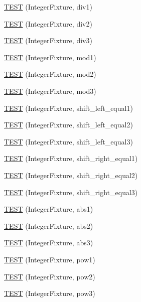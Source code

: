 \begin{DoxyCompactItemize}
\item 
\hyperlink{temp_test_integer_8c_09_09_adb0d928491fb9ea9cc626a106df71593}{T\-E\-S\-T} (Integer\-Fixture, div1)
\item 
\hyperlink{temp_test_integer_8c_09_09_ad51a92e11e604831df276045d3302c82}{T\-E\-S\-T} (Integer\-Fixture, div2)
\item 
\hyperlink{temp_test_integer_8c_09_09_a3d8823c1928745620c842c34fd753c9f}{T\-E\-S\-T} (Integer\-Fixture, div3)
\item 
\hyperlink{temp_test_integer_8c_09_09_a5a3e5e2da8ceac800cf98ccc31190fb3}{T\-E\-S\-T} (Integer\-Fixture, mod1)
\item 
\hyperlink{temp_test_integer_8c_09_09_af8da24ec2c1997a271cf2132d137fa5d}{T\-E\-S\-T} (Integer\-Fixture, mod2)
\item 
\hyperlink{temp_test_integer_8c_09_09_a2b100215b05edf640337b4808eef0447}{T\-E\-S\-T} (Integer\-Fixture, mod3)
\item 
\hyperlink{temp_test_integer_8c_09_09_ac61631f702c7ea22e5bd4fa98969e9ea}{T\-E\-S\-T} (Integer\-Fixture, shift\-\_\-left\-\_\-equal1)
\item 
\hyperlink{temp_test_integer_8c_09_09_a5fa62bd8086b90cd8f34c9b8c323f1e6}{T\-E\-S\-T} (Integer\-Fixture, shift\-\_\-left\-\_\-equal2)
\item 
\hyperlink{temp_test_integer_8c_09_09_a0ac3a659eb01bc27e764ec6832d53c62}{T\-E\-S\-T} (Integer\-Fixture, shift\-\_\-left\-\_\-equal3)
\item 
\hyperlink{temp_test_integer_8c_09_09_a37ed42e0089ee636a2c8ce9fa3b2f65f}{T\-E\-S\-T} (Integer\-Fixture, shift\-\_\-right\-\_\-equal1)
\item 
\hyperlink{temp_test_integer_8c_09_09_a1ce22a70294a53e2d85b7f113710d95e}{T\-E\-S\-T} (Integer\-Fixture, shift\-\_\-right\-\_\-equal2)
\item 
\hyperlink{temp_test_integer_8c_09_09_aa129a03b21d6e2c23e7bf3cf254edeff}{T\-E\-S\-T} (Integer\-Fixture, shift\-\_\-right\-\_\-equal3)
\item 
\hyperlink{temp_test_integer_8c_09_09_a17d2e19e3ee00f0ed7155677e1b154a6}{T\-E\-S\-T} (Integer\-Fixture, abs1)
\item 
\hyperlink{temp_test_integer_8c_09_09_a7504320f0b9dd100aec4822556a0598a}{T\-E\-S\-T} (Integer\-Fixture, abs2)
\item 
\hyperlink{temp_test_integer_8c_09_09_ae4016846ce98202c9b9bb37d2c139028}{T\-E\-S\-T} (Integer\-Fixture, abs3)
\item 
\hyperlink{temp_test_integer_8c_09_09_ac1f98278a1a88743082f3a97e5180a2e}{T\-E\-S\-T} (Integer\-Fixture, pow1)
\item 
\hyperlink{temp_test_integer_8c_09_09_ac2880cab72f5b9dd22bba9b7dc6c7c4b}{T\-E\-S\-T} (Integer\-Fixture, pow2)
\item 
\hyperlink{temp_test_integer_8c_09_09_a3bf1a95e5c364f3cf8dd3a2ebbf4a455}{T\-E\-S\-T} (Integer\-Fixture, pow3)
\end{DoxyCompactItemize}


